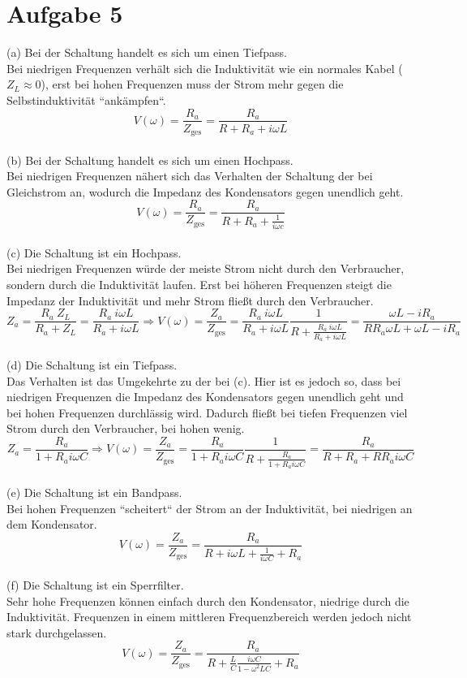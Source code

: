 \documentclass[11pt a4paper]{article}
\begin{document}
\newpage

\section*{Aufgabe 5}

\quad (a) Bei der Schaltung handelt es sich um einen Tiefpass. \\
Bei niedrigen Frequenzen verhält sich die Induktivität 
wie ein normales Kabel ($Z_L \approx 0$), erst bei hohen Frequenzen muss der Strom mehr gegen die 
Selbstinduktivität ``ankämpfen``.
\[ V(\omega) = \frac{R_a}{Z_\text{ges}} = \frac{R_a}{R + R_a + i\omega L} \]
\\

(b) Bei der Schaltung handelt es sich um einen Hochpass. \\
Bei niedrigen Frequenzen nähert sich das Verhalten der
Schaltung der bei Gleichstrom an, wodurch die Impedanz des Kondensators gegen unendlich geht.
\[ V(\omega) = \frac{R_a}{Z_\text{ges}} = \frac{R_a}{R + R_a + \frac{1}{i\omega c}} \]
\\

(c) Die Schaltung ist ein Hochpass. \\
Bei niedrigen Frequenzen würde der meiste Strom nicht durch den Verbraucher, sondern durch die Induktivität laufen.
Erst bei höheren Frequenzen steigt die Impedanz der Induktivität und mehr Strom fließt durch den Verbraucher.
\[
	Z_a = \frac{R_a \ Z_L}{R_a + Z_L} = \frac{R_a \ i\omega L}{R_a + i\omega L} 
	\Rightarrow 
	V(\omega) = \frac{Z_a}{Z_\text{ges}} 
	= \frac{R_a \ i\omega L}{R_a + i\omega L} \frac{1}{R + \frac{R_a \ i\omega L}{R_a + i\omega L}}
	= \frac{\omega L - iR_a}{R R_a \omega L + \omega L - iR_a}
\]
\\

(d) Die Schaltung ist ein Tiefpass. \\
Das Verhalten ist das Umgekehrte zu der bei (c). Hier ist es jedoch so, dass bei niedrigen Frequenzen die Impedanz
des Kondensators gegen unendlich geht und bei hohen Frequenzen durchlässig wird. Dadurch fließt bei tiefen
Frequenzen viel Strom durch den Verbraucher, bei hohen wenig.
\[
	Z_a = \frac{R_a}{1 + R_a i\omega C}
	\Rightarrow 
	V(\omega) = \frac{Z_a}{Z_\text{ges}} 
	= \frac{R_a}{1 + R_a i\omega C} \frac{1}{R + \frac{R_a}{1 + R_a i\omega C}}
	= \frac{R_a}{R + R_a + RR_a i\omega C}
\]
\\

(e) Die Schaltung ist ein Bandpass. \\
Bei hohen Frequenzen ``scheitert`` der Strom an der Induktivität, bei niedrigen an dem Kondensator.
\[
	V(\omega) = \frac{Z_a}{Z_\text{ges}} = \frac{R_a}{R + i\omega L + \frac{1}{i \omega C} + R_a}
\]
\\

(f) Die Schaltung ist ein Sperrfilter. \\
Sehr hohe Frequenzen können einfach durch den Kondensator, niedrige durch die Induktivität. Frequenzen in einem
mittleren Frequenzbereich werden jedoch nicht stark durchgelassen.
\[
	V(\omega) = \frac{Z_a}{Z_\text{ges}} 
	= \frac{R_a}{R + \frac{L}{C} \frac{i\omega C}{1 - \omega^2 LC} + R_a}
\]
\end{document}
